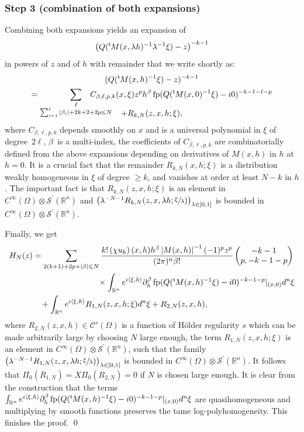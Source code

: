 \documentclass[10pt]{amsart}
\let\pazocal\mathscr
\theoremstyle{definition}
\let\euler X
\DeclareMathOperator*{\pf}{fp}
\newcommand{\module}[1]{\left|#1\right|}
\newcommand{\opencl}[1]{\mathopen{}\mathclose{\left]#1 \right]}}
\newcommand{\step}[1]{\subsubsection*{Step #1}}
\newcommand\fantom{\\ &\phantom{=}\,}
\renewcommand{\t}{{{}^{\mathrm{t}\mkern-2mu}}}
\begin{document}
\step{3 (combination of both expansions)}
Combining both expansions yields an expansion of
\[
\big(Q(\t M(x,\lambda h)^{-1}\lambda^{-1}\xi)-z\big)^{-k-1}
\]
in powers of $z$ and of $h$
with remainder that we write shortly as:
\begin{multline*}
(Q(\t M(x,h)^{-1}\xi)-z)^{-k-1}\\
= \sum_{\substack{\ell\\\sum_{i=1}^\ell\vert \beta_i\vert+2k+2+2p\leqslant N}}\hspace*{-10mm} C_{\beta,\ell,p,k}(x,\xi) z^p h^\beta \pf(Q(\t M(x, 0)^{-1}\xi)-i0)^{-k-1-\ell-p}\\[-15pt]
+R_{k,N}(z,x,h;\xi),
\end{multline*}
where $C_{\beta,\ell,p,k}$ depends smoothly on $x$ and is a universal polynomial in $\xi$ of degree~$2\ell$, $\beta$~is a multi-index, the coefficients
of $C_{\beta,\ell,p,k}$ are combinatorially defined from the above expansions depending on derivatives of $M(x,h)$ in $h$ at $h\!=\!0$.
It is a crucial fact that the remainder $R_{k,N}(x,h;\xi)$ is a distribution weakly homogeneous in $\xi$ of degree $\geqslant\! k$, and
vanishes at order at least $N-k$ in $h$.
The important fact is that
$R_{k,N}(z,x,h;\xi)$ is an element in $C^\infty\left(\Omega\right)\otimes \pazocal{S}^\prime\left(\mathbb{R}^{n}\right)$ and
$\big(\lambda^{-N-1} R_{k,N}(z,x,\lambda h;\sfrac{\xi}{\lambda})\big)_{\lambda\in \opencl{0,1}} $ is
bounded in $C^\infty\left(\Omega\right)\otimes \pazocal{S}^\prime\left(\mathbb{R}^{n}\right)$.

Finally, we get
\[
\begin{aligned}
H_N(z)&=\sum_{2(k+1)+2p+\vert \beta\vert\leqslant N} \frac{k!\left(\chi u_k\right)(x,h)h^\beta\module{M(x,h)}^{-1}{(-1)^p}z^p}{(2\pi)^n\beta !} \begin{pmatrix}
-k-1\\
p,-k-1-p
\end{pmatrix} \fantom\phantom{=========} \times \int_{\mathbb{R}^n}e^{i\left\langle\xi,h\right\rangle}
\partial^\beta_h \pf(Q(\t M(x, h)^{-1}\xi)-i0)^{-k-1-p}|_{(x,0)}d^n\xi
\fantom +\int_{\mathbb{R}^n}e^{i\left\langle\xi,h\right\rangle}R_{1,N}(z,x,h;\xi)d^n\xi +R_{2,N}(z,x,h),
\end{aligned}
\]
where $R_{2,N}(z,x,h)\in \pazocal{C}^{s}\left(\Omega\right)$ is a function of
Hölder regularity $s$ which can be made arbitrarily large by choosing $N$ large enough, the term
$R_{1,N}(z,x,h;\xi)$ is an element in $C^\infty\left(\Omega\right)\otimes \pazocal{S}^\prime\left(\mathbb{R}^{n}\right)$,
such that the family
$\big(\lambda^{-N-1} R_{1,N}(z,x,\lambda h;\sfrac{\xi}{\lambda})\big)_{\lambda\in \opencl{0,1}} $ is
bounded in $C^\infty\left(\Omega\right)\otimes \pazocal{S}^\prime\left(\mathbb{R}^{n}\right)$.
It follows that $\Pi_0\left(R_{1,N} \right)=\euler\Pi_0\left(R_{2,N} \right)=0$ if $N$ is chosen large enough.
It is clear from the construction that the terms
$\int_{\mathbb{R}^n}e^{i\left\langle\xi,h\right\rangle}
\partial^\beta_h \pf(Q(\t M(x, h)^{-1}\xi)-i0)^{-k-1-p}|_{(x,0)}d^n\xi$ are quasihomogeneous
and multiplying by smooth functions preserves the tame log-polyhomogeneity. This finishes the proof.
\qed
\end{document}

